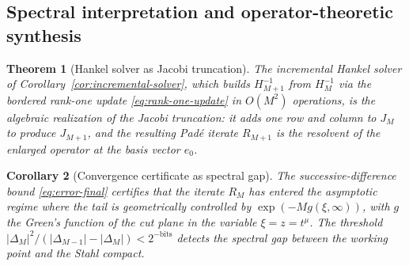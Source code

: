 \documentclass[11pt]{article}
\newtheorem{theorem}{Theorem}[section]
\newtheorem{corollary}[theorem]{Corollary}
\theoremstyle{definition}
\theoremstyle{remark}
\begin{document}
\subsection{Spectral interpretation and operator-theoretic synthesis}
\label{sec:heston-spectral}

\begin{theorem}[Hankel solver as Jacobi truncation]
\label{thm:hankel-jacobi}
The incremental Hankel solver of Corollary~\ref{cor:incremental-solver}, which builds $H_{M+1}^{-1}$ from $H_{M}^{-1}$ via the bordered rank-one update \eqref{eq:rank-one-update} in $O(M^{2})$ operations, is the algebraic realization of the Jacobi truncation: it adds one row and column to $J_{M}$ to produce $J_{M+1}$, and the resulting Pad\'e iterate $R_{M+1}$ is the resolvent of the enlarged operator at the basis vector $e_{0}$.
\end{theorem}

\begin{corollary}[Convergence certificate as spectral gap]
\label{cor:spectral-gap}
The successive-difference bound \eqref{eq:error-final} certifies that the iterate $R_{M}$ has entered the asymptotic regime where the tail is geometrically controlled by $\exp(-Mg(\xi,\infty))$, with $g$ the Green's function of the cut plane in the variable $\xi=z=t^{\mu}$. The threshold $|\Delta_{M}|^{2}/(|\Delta_{M-1}|-|\Delta_{M}|)<2^{-\mathrm{bits}}$ detects the spectral gap between the working point and the Stahl compact.
\end{corollary}
\end{document}
